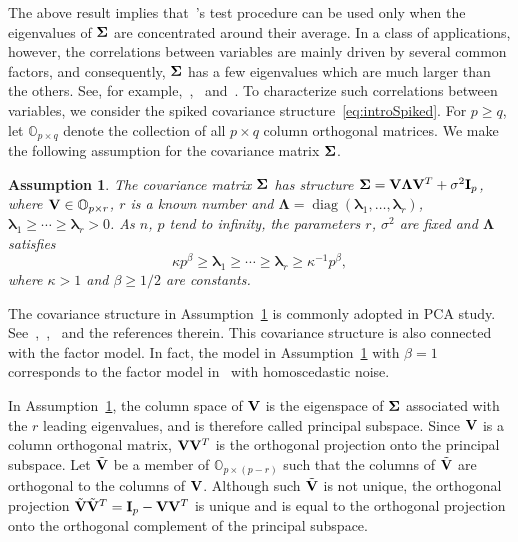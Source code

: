 \documentclass[review]{elsarticle}
\DeclareMathOperator{\mydiag}{diag}
\newcommand{\bfsym}[1]{\ensuremath{\boldsymbol{#1}}}
\def\blambda {\bfsym {\lambda}}        \def\bLambda {\bfsym {\Lambda}}
\theoremstyle{plain}
\newtheorem{assumption}{\quad\quad Assumption}
\theoremstyle{definition}
\theoremstyle{remark}
\begin{document}
    The above result implies that~\cite{Chen2010A}'s test procedure can be used only when the eigenvalues of $\bSigma$ are concentrated around their average. 
   In a class of applications, however, the correlations between variables are mainly driven by several common factors, and consequently, $\bSigma$ has a few eigenvalues which are much larger than the others.
    See, for example,~\cite{Jung2009PCA},~\cite{Cai2012Sparse} and~\cite{Fan2015Asymptotics}.
To characterize such correlations between variables, we consider the  spiked covariance structure~\eqref{eq:introSpiked}.
For $p\geq q$, let $\mathbb{O}_{p\times q}$ denote the collection of all $p\times q$ column orthogonal matrices.
We make the following assumption for the covariance matrix $\bSigma$.
\begin{assumption}\label{theModel}
    The covariance matrix $\bSigma$ has structure $ \bSigma=\BV\bLambda \BV^T+\sigma^2 \BI_p$, where $\mathbf{V}\in\mathbb{O}_{p\times r}$, $r$ is a known number and $\bLambda=\mydiag(\blambda_{1},\ldots,\blambda_{r})$, 
 $\blambda_{1}\geq \cdots \geq \blambda_{r}>0$.
As $n$, $p$ tend to infinity, the parameters
$r$, $\sigma^2$ are fixed and $\bLambda$ satisfies     
    \begin{equation*}
        \kappa p^{\beta}\geq \blambda_{1}\geq \cdots \geq\blambda_{r}\geq \kappa^{-1}p^{\beta},
\end{equation*}
where $\kappa>1$ and $\beta\geq {1}/{2}$ are constants.
\end{assumption}

The covariance structure in Assumption~\ref{theModel} is commonly adopted in PCA study.
See~\cite{Cai2012Sparse},~\cite{Birnbaum2013},~\cite{Passemier2015} and the references therein.
This covariance structure is also connected with the factor model.
In fact, the model in Assumption~\ref{theModel} with $\beta=1$
corresponds to the factor model in~\cite{Ma2015A} with homoscedastic noise.

In Assumption~\ref{theModel}, the column space of $\mathbf{V}$ is the eigenspace of $\bSigma$ associated with the $r$ leading eigenvalues, and is therefore called principal subspace. Since $\mathbf{V}$ is a column orthogonal matrix, $\mathbf{V} \mathbf{V}^T$ is the orthogonal projection onto the principal subspace.
Let $\tilde{\mathbf{V}}$ be a member of $\mathbb{O}_{p\times (p-r)}$ such that the columns of $\tilde{\mathbf{V}}$ are orthogonal to the columns of  $\mathbf{V}$.
 Although such $\tilde{\mathbf{V}}$ is not unique, the orthogonal projection  $\tilde{\mathbf{V}}\tilde{\mathbf{V}}^T=\mathbf{I}_p-\mathbf{V} \mathbf{V}^T$ is unique and is equal to the orthogonal projection onto the orthogonal complement of the principal subspace.
\end{document}
